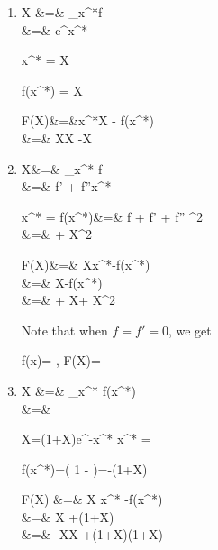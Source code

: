 \begin{enumerate}
\item

\beq
{}
\eeq

\beqa
X &=& \partial_{x^*}f
\\
&=&
e^{x^*}
\eeqa

\beq
x^* = \ln  X
\eeq

\beq
f(x^*) = X
\eeq

\beqa
F(X)&=&x^*X - f(x^*)
\\
&=&
X\ln X -X
\eeqa




\item 
\beq
{}
\eeq

\beqa
X&=&
\partial_{x^*} f
\\
&=&
f' + f''x^*
\label{eq-X-xstar}
\eeqa

\beq
x^* = 
\eeq
\beqa
f(x^*)&=& f
+
f' 
+
f''
^2
\\
&=&
+
X^2
\eeqa

\beqa
F(X)&=&
Xx^*-f(x^*)
\\
&=&
X
-f(x^*)
\\
&=&
+
X
+
X^2
\eeqa

Note that when $f=f'=0$,
we get 

\beq
f(x)= 
,\quad 
F(X)= 
\eeq

%
%
%
%


\item
\beq
{}
\eeq

\beqa
X
&=&
\partial_{x^*} f(x^*)
\\
&=&
\eeqa

\beq
X=(1+X)e^{-x^*}
\eeq
\beq
x^* = \ln{}
\eeq

\beq
f(x^*)=\ln\left(
1 - 
\right)=-\ln(1+X)
\eeq

\beqa
F(X) &=& X x^* -f(x^*)
\\
&=&
X \ln{}
+\ln(1+X)
\\
&=&
-X\ln  X
+(1+X)\ln(1+X)
\eeqa
\end{enumerate}



